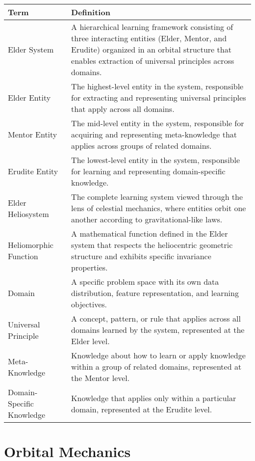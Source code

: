 \begin{center}
\begin{tabular}{|l|p{12cm}|}
\hline
\textbf{Term} & \textbf{Definition} \\
\hline
Elder System & A hierarchical learning framework consisting of three interacting entities (Elder, Mentor, and Erudite) organized in an orbital structure that enables extraction of universal principles across domains. \\
\hline
Elder Entity & The highest-level entity in the system, responsible for extracting and representing universal principles that apply across all domains. \\
\hline
Mentor Entity & The mid-level entity in the system, responsible for acquiring and representing meta-knowledge that applies across groups of related domains. \\
\hline
Erudite Entity & The lowest-level entity in the system, responsible for learning and representing domain-specific knowledge. \\
\hline
Elder Heliosystem & The complete learning system viewed through the lens of celestial mechanics, where entities orbit one another according to gravitational-like laws. \\
\hline
Heliomorphic Function & A mathematical function defined in the Elder system that respects the heliocentric geometric structure and exhibits specific invariance properties. \\
\hline
Domain & A specific problem space with its own data distribution, feature representation, and learning objectives. \\
\hline
Universal Principle & A concept, pattern, or rule that applies across all domains learned by the system, represented at the Elder level. \\
\hline
Meta-Knowledge & Knowledge about how to learn or apply knowledge within a group of related domains, represented at the Mentor level. \\
\hline
Domain-Specific Knowledge & Knowledge that applies only within a particular domain, represented at the Erudite level. \\
\hline
\end{tabular}
\label{tab:core_terminology}
\end{center}

\section{Orbital Mechanics}

